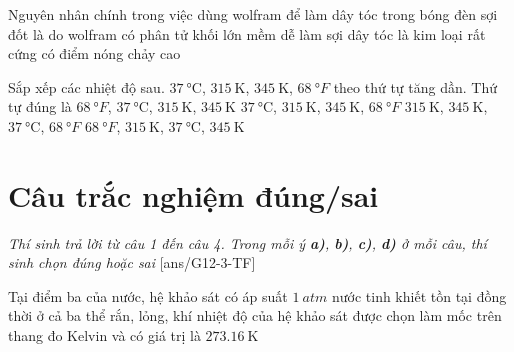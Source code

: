 \begin{ex}
	Nguyên nhân chính trong việc dùng wolfram để làm dây tóc trong bóng đèn sợi đốt là do wolfram
	\choice
	{có phân tử khối lớn}
	{mềm dễ làm sợi dây tóc}
	{là kim loại rất cứng}
	{\True có điểm nóng chảy cao}
	\loigiai{}
\end{ex}
\begin{ex}
	Sắp xếp các nhiệt độ sau. $\SI{37}{\celsius}$, $\SI{315}{\kelvin}$, $\SI{345}{\kelvin}$, $\SI{68}{\degree F}$ theo thứ tự tăng dần. Thứ tự đúng là
	\choice
	{\True $\SI{68}{\degree F}$, $\SI{37}{\celsius}$, $\SI{315}{\kelvin}$, $\SI{345}{\kelvin}$}
	{$\SI{37}{\celsius}$,  $\SI{315}{\kelvin}$, $\SI{345}{\kelvin}$, $\SI{68}{\degree F}$}
	{$\SI{315}{\kelvin}$,  $\SI{345}{\kelvin}$, $\SI{37}{\celsius}$, $\SI{68}{\degree F}$}
	{$\SI{68}{\degree F}$, $\SI{315}{\kelvin}$, $\SI{37}{\celsius}$, $\SI{345}{\kelvin}$}
	\loigiai{}
\end{ex}
\section{Câu trắc nghiệm đúng/sai} 
\textit{Thí sinh trả lời từ câu 1 đến câu 4. Trong mỗi ý \textbf{a)}, \textbf{b)}, \textbf{c)}, \textbf{d)} ở mỗi câu, thí sinh chọn đúng hoặc sai}
\setcounter{ex}{0}
[ans/G12-3-TF]
\begin{ex}
Tại điểm ba của nước,	
	{hệ khảo sát có áp suất $\SI{1}{atm}$}
	{\True nước tinh khiết tồn tại đồng thời ở cả ba thể rắn, lỏng, khí}
	{\True nhiệt độ của hệ khảo sát được chọn làm mốc trên thang đo Kelvin và có giá trị là $\SI{273.16}{\kelvin}$}
\end{ex}



